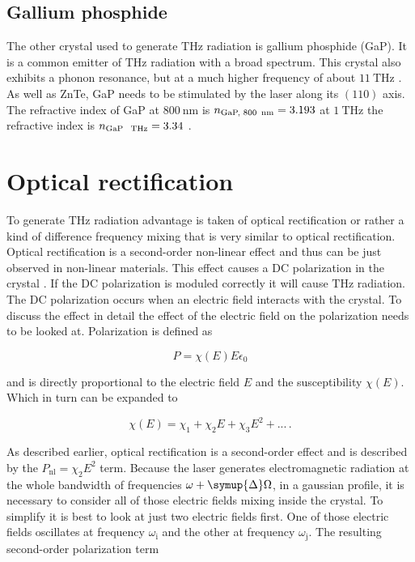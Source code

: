 \subsection{Gallium phosphide}
The other crystal used to generate $\si{\tera\hertz}$ radiation is gallium phosphide (GaP).
It is a common emitter of $\si{\tera\hertz}$ radiation with a broad spectrum.
This crystal also exhibits a phonon resonance, but at a much higher frequency of about $\SI{11}{\tera\hertz}$ \cite{wiki_book}.
As well as ZnTe, GaP needs to be stimulated by the laser along its $(110)$ axis.
The refractive index of GaP at $\SI{800}{\nano\meter}$ is $n_\text{GaP, 800\, nm} = 3.193$ \cite{refractive_index_gap} at $\SI{1}{\tera\hertz}$ the refractive index is $n_\text{GaP \, THz} = 3.34$ \cite{hebling2004tunable}.


\section{Optical rectification}\label{sec:optic_ref}
To generate $\si{\tera\hertz}$ radiation advantage is taken of optical rectification or rather a kind of difference frequency mixing that is very similar to optical rectification.
Optical rectification is a second-order non-linear effect and thus can be just observed in non-linear materials.
This effect causes a DC polarization in the crystal \cite{wiki_book}.
If the DC polarization is moduled correctly it will cause $\si{\tera\hertz}$ radiation.
The DC polarization occurs when an electric field interacts with the crystal.
To discuss the effect in detail the effect of the electric field on the polarization needs to be looked at.
Polarization is defined as

\begin{equation}
P = \chi(E) E \epsilon_0
\end{equation}

and is directly proportional to the electric field $E$ and the susceptibility $\chi(E)$.
Which in turn can be expanded to 

\begin{equation}
    \chi(E) = \chi_1 + \chi_2 E +\chi_3 E^2 + ...   \, .
\end{equation}

As described earlier, optical rectification is a second-order effect and is described by the $P_\text{nl} = \chi_2 E^2$ term.
Because the laser generates electromagnetic radiation at the whole bandwidth of frequencies $\omega + \symup{\Delta}\Omega$, in a gaussian profile, it is necessary to consider all of those electric fields mixing inside the crystal.
To simplify it is best to look at just two electric fields first.
One of those electric fields oscillates at frequency $\omega_\text{i}$ and the other at frequency $\omega_\text{j}$.
The resulting second-order polarization term 


